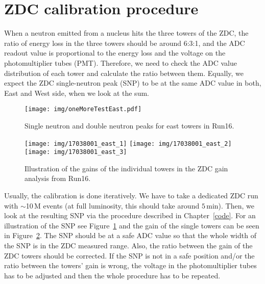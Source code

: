 \section{ZDC calibration procedure}

When a neutron emitted from a nucleus hits the three towers of the ZDC, the ratio of energy loss
in the three towers should be 
around 6:3:1, and the ADC readout value is proportional to the energy loss and the voltage on the
photomultiplier tubes (PMT)\@. Therefore, we need to check the ADC value 
distribution of each tower and calculate the ratio between them. Equally, we expect the ZDC 
single-neutron peak (SNP) to
be at the same ADC value in both, East and West side, when we look at the sum.

\begin{figure}[htb]
\begin{center}
\texttt{[image: img/oneMoreTestEast.pdf]}
\end{center}
\caption{\label{SNPillustration} Single neutron and double neutron peaks for east towers in Run16.}

\end{figure}

\begin{figure}[htb]
\begin{center}
\texttt{[image: img/17038001\_east\_1]}
\texttt{[image: img/17038001\_east\_2]}
\texttt{[image: img/17038001\_east\_3]}
\end{center}
\caption{\label{gain}Illustration of the gains of the individual towers in the ZDC gain analysis from Run16.}

\end{figure}

Usually, the calibration is done iteratively. We have to take a dedicated ZDC run with
$\sim$10$\,$M events (at full luminosity, this should take around $5\,$min). Then, we
look at the resulting SNP via the procedure described in Chapter~\ref{code}.
For an illustration of the SNP see Figure~\ref{SNPillustration} and the gain of the single
towers can be seen in Figure~\ref{gain}.
The SNP should be at a safe ADC value so that the whole width of the SNP is in the ZDC measured
range. Also, the ratio between the gain of the ZDC towers should be corrected. If the
SNP is not in a safe position and/or the ratio between the towers' gain is wrong,
the voltage in the photomultiplier tubes has to be adjusted and then the whole procedure
has to be repeated.

